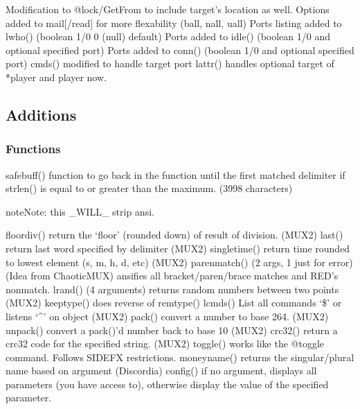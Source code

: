 \documentclass[letterpaper,10pt,english]{sphinxmanual}
\begin{document}
\sphinxAtStartPar
Modification to @lock/GetFrom to include target’s location as well.
Options added to mail{[}/read{]} for more flexability (ball, nall, uall)
Ports listing added to lwho() (boolean 1/0 \sphinxhyphen{} 0 (null) default)
Ports added to idle() (boolean 1/0 and optional specified port)
Ports added to conn() (boolean 1/0 and optional specified port)
cmds() modified to handle target port
lattr() handles optional target of *player and player now.


\subsection{Additions}
\label{\detokenize{changelog:id27}}

\subsubsection{Functions}
\label{\detokenize{changelog:id28}}
\sphinxAtStartPar
safebuff() \sphinxhyphen{} function to go back in the function until the first matched delimiter if strlen() is equal to or greater than the maximum.  (3998 characters)

\begin{sphinxadmonition}{note}{Note:}
\sphinxAtStartPar
this \_WILL\_ strip ansi.
\end{sphinxadmonition}

\sphinxAtStartPar
floordiv() \sphinxhyphen{} return the ‘floor’ (rounded down) of result of division. (MUX2)
last() \sphinxhyphen{} return last word specified by delimiter (MUX2)
singletime() \sphinxhyphen{} return time rounded to lowest element (s, m, h, d, etc) (MUX2)
parenmatch() \sphinxhyphen{} (2 args, 1 just for error) (Idea from ChaoticMUX) ansifies all bracket/paren/brace matches and RED’s nonmatch.
lrand() \sphinxhyphen{} (4 arguments) \sphinxhyphen{} returns random numbers between two points (MUX2)
keeptype() \sphinxhyphen{} does reverse of remtype()
lcmds() \sphinxhyphen{} List all commands ‘\$’ or listens ‘\textasciicircum{}’ on object (MUX2)
pack() \sphinxhyphen{} convert a number to base 2\sphinxhyphen{}64. (MUX2)
unpack() \sphinxhyphen{} convert a pack()’d number back to base 10 (MUX2)
crc32() \sphinxhyphen{} return a crc32 code for the specified string. (MUX2)
toggle() \sphinxhyphen{} works like the @toggle command.  Follows SIDEFX restrictions.
moneyname() \sphinxhyphen{} returns the singular/plural name based on argument (Discordia)
config() \sphinxhyphen{} if no argument, displays all parameters (you have access to), otherwise display the value of the specified parameter.
\end{document}
